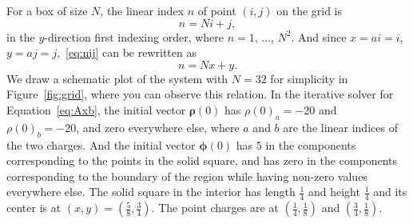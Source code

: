 For a box of size \(N\), the linear index \(n\) of point \((i, j)\) on the grid is
%
\begin{equation}\label{eq:nij}
    n = N i + j,
\end{equation}
%
in the \(y\)-direction first indexing order, where \(n = 1\), \(\ldots\), \(N^2\).
And since \(x = a i = i\), \(y = a j = j\),~\eqref{eq:nij} can be rewritten as
%
\begin{equation}
    n = N x + y.
\end{equation}
%
We draw a schematic plot of the system with \(N = 32\) for simplicity in
Figure~\ref{fig:grid}, where you can observe this relation.
In the iterative solver for Equation~\ref{eq:Axb},
the initial vector \(\bm{\rho}(0)\) has \(\rho(0)_a = -20\) and \(\rho(0)_b = -20\),
and zero everywhere else,
where \(a\) and \(b\) are the linear indices of the two charges.
And the initial vector \(\bm{\phi}(0)\) has \(5\) in the components corresponding to
the points in the solid square, and has zero in the components corresponding to
the boundary of the region while having non-zero values everywhere else.
The solid square in the interior has length \(\frac{1}{4}\) and height \(\frac{1}{4}\) and
its center is at \((x, y) = (\frac{5}{8}, \frac{3}{4})\).
The point charges are at \((\frac{1}{4}, \frac{1}{8})\) and \((\frac{3}{4}, \frac{1}{8})\).



